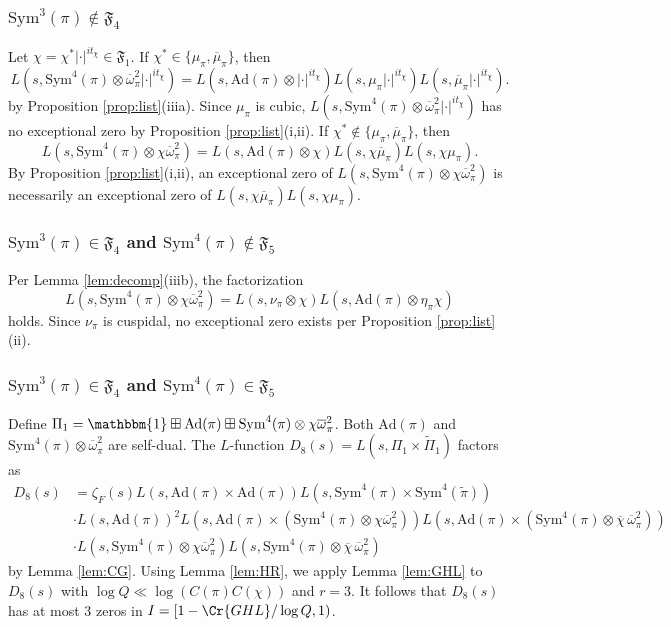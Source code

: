 \documentclass[11pt]{amsart}
\theoremstyle{remark}
\numberwithin{equation}{section}
\begin{document}
\subsubsection{$\mathrm{Sym}^3(\pi)\notin\mathfrak{F}_{4}$}
Let $\chi=\chi^*|\cdot|^{it_{\chi}}\in\mathfrak{F}_{1}$.  If $\chi^*\in\{\mu_{\pi},\overline{\mu}_{\pi}\}$, then
\[
L(s,\mathrm{Sym}^4(\pi)\otimes\overline{\omega}_{\pi}^2|\cdot|^{it_{\chi}}) = L(s,\mathrm{Ad}(\pi)\otimes|\cdot|^{it_{\chi}}) L(s,\mu_{\pi}|\cdot|^{it_{\chi}})L(s,\overline{\mu}_{\pi}|\cdot|^{it_{\chi}}).
\]
by Proposition \ref{prop:list}(iiia).  Since $\mu_{\pi}$ is cubic, $L(s,\mathrm{Sym}^4(\pi)\otimes\overline{\omega}_{\pi}^2|\cdot|^{it_{\chi}})$ has no exceptional zero by Proposition \ref{prop:list}(i,ii).  If $\chi^*\notin\{\mu_{\pi},\overline{\mu}_{\pi}\}$, then
\[
L(s,\mathrm{Sym}^4(\pi)\otimes\chi\overline{\omega}_{\pi}^2)=L(s,\mathrm{Ad}(\pi)\otimes\chi) L(s,\chi\overline{\mu}_{\pi})L(s,\chi\mu_{\pi}).
\]
By Proposition \ref{prop:list}(i,ii), an exceptional zero of $L(s,\mathrm{Sym}^4(\pi)\otimes\chi\overline{\omega}_{\pi}^2)$ is necessarily an exceptional zero of $L(s,\chi\overline{\mu}_{\pi})L(s,\chi\mu_{\pi})$.

\subsubsection{$\mathrm{Sym}^3(\pi)\in\mathfrak{F}_{4}$ and $\mathrm{Sym}^4(\pi)\notin\mathfrak{F}_{5}$}

Per Lemma \ref{lem:decomp}(iiib), the factorization
\[
L(s,\mathrm{Sym}^4(\pi)\otimes\chi\overline{\omega}_{\pi}^{2})=L(s,\nu_{\pi}\otimes\chi)L(s,\mathrm{Ad}(\pi)\otimes\eta_{\pi}\chi)
\]
holds.  Since $\nu_{\pi}$ is cuspidal, no exceptional zero exists per Proposition \ref{prop:list}(ii).

\subsubsection{$\mathrm{Sym}^3(\pi)\in\mathfrak{F}_{4}$ and $\mathrm{Sym}^4(\pi)\in\mathfrak{F}_{5}$}

Define $\Pi_1 = \mathbbm{1}\boxplus\mathrm{Ad}(\pi)\boxplus\mathrm{Sym}^4(\pi)\otimes\chi\overline{\omega}_{\pi}^{2}$.  Both $\mathrm{Ad}(\pi)$ and $\mathrm{Sym}^4(\pi)\otimes\overline{\omega}_{\pi}^2$ are self-dual.  The $L$-function $D_8(s)=L(s,\Pi_1\times\widetilde{\Pi}_1)$ factors as
\begin{align*}
D_8(s) &=\zeta_F(s)L(s,\mathrm{Ad}(\pi)\times\mathrm{Ad}(\pi)) L(s,\mathrm{Sym}^4(\pi)\times\mathrm{Sym}^4(\widetilde{\pi}))\\
&\cdot L(s,\mathrm{Ad}(\pi))^2L(s,\mathrm{Ad}(\pi)\times(\mathrm{Sym}^4(\pi)\otimes\chi\overline{\omega}_{\pi}^{2})) L(s,\mathrm{Ad}(\pi)\times(\mathrm{Sym}^4(\pi)\otimes\overline{\chi}\,\overline{\omega}_{\pi}^{2}))\\
&\cdot L(s,\mathrm{Sym}^4(\pi)\otimes\chi\overline{\omega}_{\pi}^{2}) L(s,\mathrm{Sym}^4(\pi)\otimes\overline{\chi}\,\overline{\omega}_{\pi}^{2})
\end{align*}
by Lemma \ref{lem:CG}.  Using Lemma \ref{lem:HR}, we apply Lemma \ref{lem:GHL} to $D_8(s)$ with $\log Q\ll \log (C(\pi)C(\chi))$ and $r=3$.  It follows that $D_8(s)$ has at most $3$ zeros in $I = [1-\Cr{GHL}/\log Q,1)$.
\end{document}
